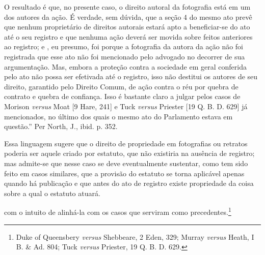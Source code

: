 {  O resultado é que, no presente caso, o direito autoral da fotografia
  está em um dos autores da ação. É verdade, sem dúvida, que a seção 4
  do mesmo ato prevê que nenhum proprietário de direitos autorais estará
  apto a beneficiar-se do ato até o seu registro e que nenhuma ação
  deverá ser movida sobre feitos anteriores ao registro; e , eu presumo,
  foi porque a fotografia da autora da ação não foi registrada que esse
  ato não foi mencionado pelo advogado no decorrer de sua argumentação.
  Mas, embora a proteção contra a sociedade em geral conferida pelo ato
  não possa ser efetivada até o registro, isso não destitui os autores
  de seu direito, garantido pelo Direito Comum, de ação contra o réu por
  quebra de contrato e quebra de confiança. Isso é bastante claro a
  julgar pelos casos de Morison \emph{versus} Moat {[}9 Hare, 241{]} e
  Tuck \emph{versus} Priester {[}19 Q. B. D. 629{]} já mencionados, no
  último dos quais o mesmo ato do Parlamento estava em questão.'' Per
  North, J., ibid. p. 352.

  Essa linguagem sugere que o direito de propriedade em fotografias ou
  retratos poderia ser aquele criado por estatuto, que não existiria na
  ausência de registro; mas admite-se que nesse caso se deve
  eventualmente sustentar, como tem sido feito em casos similares, que a
  provisão do estatuto se torna aplicável apenas quando há publicação e
  que antes do ato de registro existe propriedade da coisa sobre a qual
  o estatuto atuará.} com o intuito de alinhá-la com os casos que
serviram como precedentes.\footnote{Duke of Queensbery \emph{versus}
  Shebbeare, 2 Eden, 329; Murray \emph{versus} Heath, I B. \& Ad. 804;
  Tuck \emph{versus} Priester, 19 Q. B. D. 629.}

